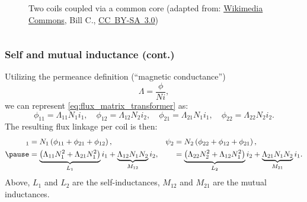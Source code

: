 \begin{frame}
\begin{columns}
\begin{column}{0.525\textwidth}
\begin{figure}
				\caption{Two coils coupled via a common core (adapted from: \href{https://commons.wikimedia.org/wiki/File:Transformer3d_col3.svg}{Wikimedia Commons}, Bill C., \href{https://creativecommons.org/licenses/by-sa/3.0/deed.en}{CC~BY-SA~3.0})}
                \label{fig:Transformer3d_col3}
			\end{figure}
		\end{column}
		\end{columns}
\end{frame}

\begin{frame}
	\frametitle{Self and mutual inductance (cont.)}
    Utilizing the permeance definition (``magnetic conductance'') 
    \begin{equation}
        \Lambda = \frac{\phi}{N i},
    \end{equation}
    \pause
    we can represent \eqref{eq:flux_matrix_transformer} as:
    \begin{equation}
        \phi_{11} = \Lambda_{11} N_1 i_1, \quad \phi_{12} = \Lambda_{12} N_2 i_2, \quad \phi_{21} = \Lambda_{21} N_1 i_1, \quad \phi_{22} = \Lambda_{22} N_2 i_2.
    \end{equation}
    \pause
    The resulting flux linkage per coil is then:
    \begin{equation}
        \begin{alignedat}{3}
        \psi_1 &= N_1\left(\phi_{11} + \phi_{21} + \phi_{12}\right), \quad && \psi_2 && =  N_2\left(\phi_{22} + \phi_{12} + \phi_{21}\right),\\ \pause
               &=\underbrace{\left(\Lambda_{11}N_1^2+\Lambda_{21}N_1^2\right)}_{L_1}i_1 + \underbrace{\Lambda_{12}N_1N_2}_{M_{12}}i_2, \quad && && =\underbrace{\left(\Lambda_{22}N_2^2+\Lambda_{12}N_1^2\right)}_{L_2}i_2 + \underbrace{\Lambda_{21}N_1N_2}_{M_{21}}i_1. 
        \end{alignedat}
        \label{eq:flux_linkage_transformer}
    \end{equation}
    Above, $L_1$ and $L_2$ are the self-inductances, $M_{12}$ and $M_{21}$ are the mutual inductances.
\end{frame}

